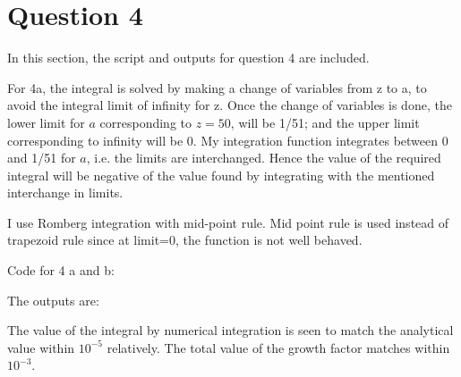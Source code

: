 \section{Question 4}

In this section, the script and outputs for question 4 are included.

For 4a, the integral is solved by making a change of variables from z to a, to avoid the integral limit of infinity for z. Once the change of variables is done, the lower limit for $a$ corresponding to $z=50$, will be 1/51; and the upper limit corresponding to infinity will be 0. My integration function integrates between 0 and 1/51 for $a$, i.e. the limits are interchanged. Hence the value of the required integral will be negative of the value found by integrating with the mentioned interchange in limits.

I use Romberg integration with mid-point rule. Mid point rule is used instead of trapezoid rule since at limit=0, the function is not well behaved.

Code for 4 a and b:


The outputs are:


The value of the integral by numerical integration is seen to match the analytical value within $10^{-5}$ relatively. The total value of the growth factor matches within $10^{-3}$.